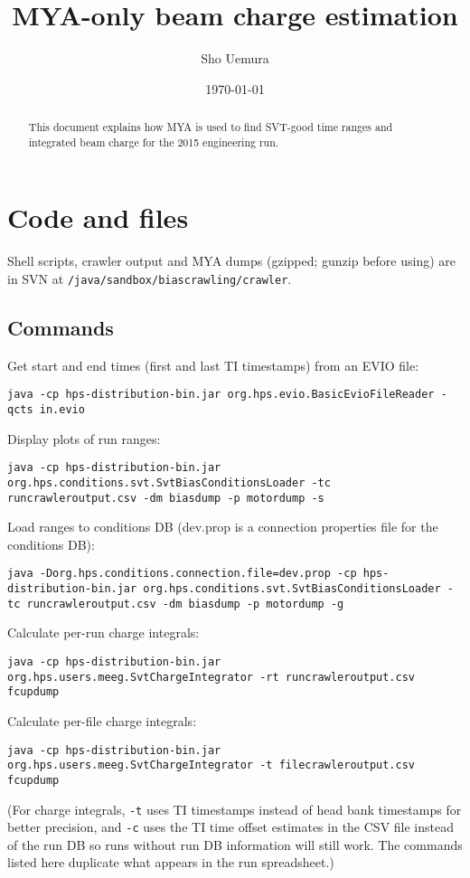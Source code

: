 \documentclass[aps,amsmath,amssymb,notitlepage,11pt,onecolumn]{revtex4-1}
\begin{document}

\title{MYA-only beam charge estimation}
\author{Sho Uemura}
\date{\today}
\begin{abstract}
    This document explains how MYA is used to find SVT-good time ranges and integrated beam charge for the 2015 engineering run.
\end{abstract}
\maketitle

\section{Code and files}

Shell scripts, crawler output and MYA dumps (gzipped; gunzip before using) are in SVN at \texttt{/java/sandbox/biascrawling/crawler}.

\subsection{Commands}
Get start and end times (first and last TI timestamps) from an EVIO file:

\texttt{java -cp hps-distribution-bin.jar org.hps.evio.BasicEvioFileReader -qcts in.evio}

Display plots of run ranges:

\texttt{java -cp hps-distribution-bin.jar org.hps.conditions.svt.SvtBiasConditionsLoader -tc runcrawleroutput.csv -dm biasdump -p motordump -s}

Load ranges to conditions DB (dev.prop is a connection properties file for the conditions DB):

\texttt{java -Dorg.hps.conditions.connection.file=dev.prop -cp hps-distribution-bin.jar org.hps.conditions.svt.SvtBiasConditionsLoader -tc runcrawleroutput.csv -dm biasdump -p motordump -g}

Calculate per-run charge integrals:

\texttt{java -cp hps-distribution-bin.jar org.hps.users.meeg.SvtChargeIntegrator -rt runcrawleroutput.csv fcupdump}

Calculate per-file charge integrals:

\texttt{java -cp hps-distribution-bin.jar org.hps.users.meeg.SvtChargeIntegrator -t filecrawleroutput.csv fcupdump}

(For charge integrals, \texttt{-t} uses TI timestamps instead of head bank timestamps for better precision, and \texttt{-c} uses the TI time offset estimates in the CSV file instead of the run DB so runs without run DB information will still work.
The commands listed here duplicate what appears in the run spreadsheet.)
\end{document}
